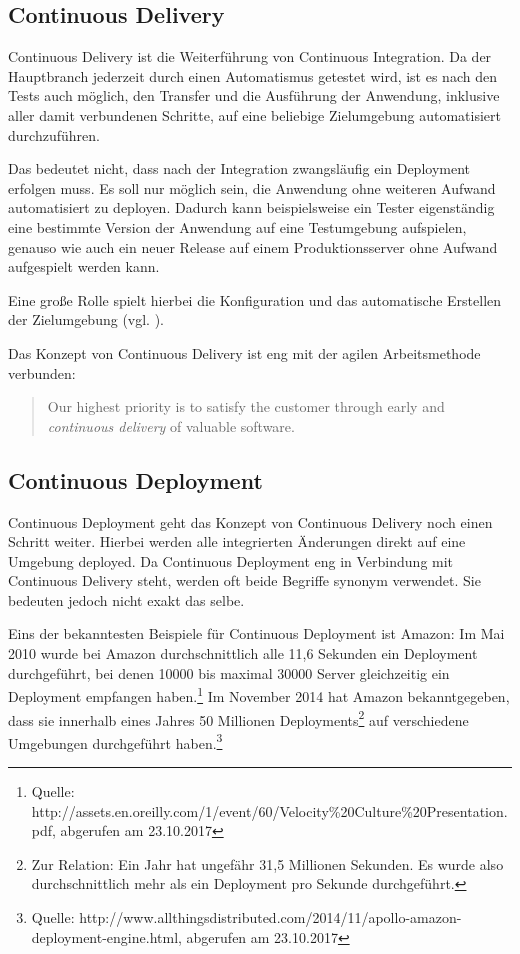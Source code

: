 \subsection{Continuous Delivery}

Continuous Delivery ist die Weiterführung von Continuous Integration. Da der Hauptbranch jederzeit durch einen Automatismus getestet wird, ist es nach den Tests auch möglich, den Transfer und die Ausführung der Anwendung, inklusive aller damit verbundenen Schritte, auf eine beliebige Zielumgebung automatisiert durchzuführen.

Das bedeutet nicht, dass nach der Integration zwangsläufig ein Deployment erfolgen muss. Es soll nur möglich sein, die Anwendung ohne weiteren Aufwand automatisiert zu deployen. Dadurch kann beispielsweise ein Tester eigenständig eine bestimmte Version der Anwendung auf eine Testumgebung aufspielen, genauso wie auch ein neuer Release auf einem Produktionsserver ohne Aufwand aufgespielt werden kann. \citep{FowlerCD}

Eine große Rolle spielt hierbei die Konfiguration und das automatische Erstellen der Zielumgebung (vgl. ).

Das Konzept von Continuous Delivery ist eng mit der agilen Arbeitsmethode \citep{AgileManifesto} verbunden:

\begin{quote}
  Our highest priority is to satisfy the customer through early and \emph{continuous delivery} of valuable software.
\end{quote}

\subsection{Continuous Deployment}

Continuous Deployment geht das Konzept von Continuous Delivery noch einen Schritt weiter. Hierbei werden alle integrierten Änderungen direkt auf eine Umgebung deployed. Da Continuous Deployment eng in Verbindung mit Continuous Delivery steht, werden oft beide Begriffe synonym verwendet. Sie bedeuten jedoch nicht exakt das selbe. \citep{FowlerCD}

Eins der bekanntesten Beispiele für Continuous Deployment ist Amazon: Im Mai 2010 wurde bei Amazon durchschnittlich alle 11,6 Sekunden ein Deployment durchgeführt, bei denen 10000 bis maximal 30000 Server gleichzeitig ein Deployment empfangen haben.\footnote{Quelle: http://assets.en.oreilly.com/1/event/60/Velocity\%20Culture\%20Presentation.pdf, abgerufen am 23.10.2017} Im November 2014 hat Amazon bekanntgegeben, dass sie innerhalb eines Jahres 50 Millionen Deployments\footnote{Zur Relation: Ein Jahr hat ungefähr 31,5 Millionen Sekunden. Es wurde also durchschnittlich mehr als ein Deployment pro Sekunde durchgeführt.} auf verschiedene Umgebungen durchgeführt haben.\footnote{Quelle: http://www.allthingsdistributed.com/2014/11/apollo-amazon-deployment-engine.html, abgerufen am 23.10.2017}

